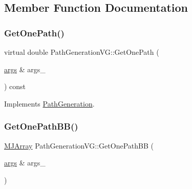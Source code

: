 \subsection{Member Function Documentation}
\hypertarget{classPathGenerationVG_ae5b96a684d59be9b06aa3b2eb8ac5b5f}{}\label{classPathGenerationVG_ae5b96a684d59be9b06aa3b2eb8ac5b5f} 
\subsubsection{\texorpdfstring{Get\+One\+Path()}{GetOnePath()}}
{\footnotesize\ttfamily virtual double Path\+Generation\+V\+G\+::\+Get\+One\+Path (\begin{DoxyParamCaption}\item[{\hyperlink{path__generation_8h_a75c13cde2074f502cc4348c70528572d}{args} \&}]{args\+\_\+ }\end{DoxyParamCaption}) const\hspace{0.3cm}{\ttfamily [virtual]}}



Implements \hyperlink{classPathGeneration_a9a64a37f4dd9b2b3ef84f3cb66aed843}{Path\+Generation}.

\hypertarget{classPathGenerationVG_ab5a58fdf0b8c9354745dcb8d91304eea}{}\label{classPathGenerationVG_ab5a58fdf0b8c9354745dcb8d91304eea} 
\subsubsection{\texorpdfstring{Get\+One\+Path\+B\+B()}{GetOnePathBB()}}
{\footnotesize\ttfamily \hyperlink{classMJArray}{M\+J\+Array} Path\+Generation\+V\+G\+::\+Get\+One\+Path\+BB (\begin{DoxyParamCaption}\item[{\hyperlink{path__generation_8h_a75c13cde2074f502cc4348c70528572d}{args} \&}]{args\+\_\+ }\end{DoxyParamCaption})}

\hypertarget{classPathGenerationVG_a298f0f8b2b11e912558044a8a2b5d8e9}{}\label{classPathGenerationVG_a298f0f8b2b11e912558044a8a2b5d8e9} 
